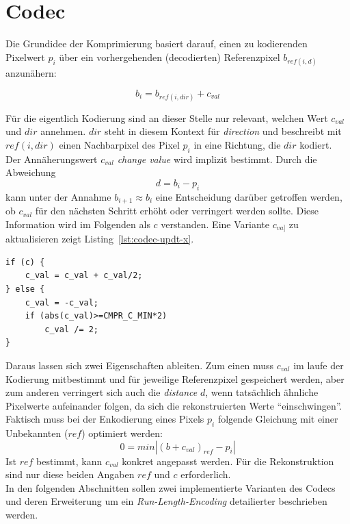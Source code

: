 
\chapter{Codec}


Die Grundidee der Komprimierung basiert darauf, einen zu kodierenden Pixelwert
$p_{i}$  \"uber ein vorhergehenden (decodierten) Referenzpixel $b_{ref(i,d)}$ anzun\"ahern:

\begin{equation}
    b_i = b_{ref(i,dir)} + c_{val}
\label{form:enc-basic}
\end{equation}

F\"ur die eigentlich Kodierung sind an dieser Stelle nur relevant, welchen Wert
$c_{val}$ und $dir$ annehmen. $dir$ steht in diesem Kontext f\"ur \textit{direction} und
beschreibt mit $ref(i,dir)$ einen Nachbarpixel des Pixel $p_i$ in eine Richtung,
die $dir$ kodiert. Der Ann\"aherungswert $c_{val}$ \textit{change value} wird implizit 
bestimmt. Durch die Abweichung
\begin{equation}
    d = b_i - p_i
\label{form:enc-dist}
\end{equation}
kann unter der Annahme $b_{i+1} \approx b_i$ eine Entscheidung dar\"uber getroffen 
werden, ob $c_{val}$ f\"ur den n\"achsten Schritt erh\"oht oder verringert werden
sollte. Diese Information wird im Folgenden als $c$ verstanden. Eine Variante
$c_{va]}$ zu aktualisieren zeigt Listing~\ref{lst:codec-updt-x}.
%
\begin{lstlisting}[caption=Aktualisierung von $c_{val}$ anhand des $c$-Flags,%
                   label=lst:codec-updt-x]
if (c) {
    c_val = c_val + c_val/2;
} else {
    c_val = -c_val;
    if (abs(c_val)>=CMPR_C_MIN*2) 
        c_val /= 2;
}
\end{lstlisting}
%
Daraus lassen sich  zwei Eigenschaften ableiten. Zum einen muss $c_{val}$ im
laufe der Kodierung mitbestimmt und f\"ur jeweilige Referenzpixel gespeichert werden, aber
zum anderen verringert sich auch die \textit{distance} $d$, wenn tats\"achlich
\"ahnliche Pixelwerte aufeinander folgen, da sich die rekonstruierten Werte
``einschwingen''.
Faktisch muss bei der Enkodierung eines Pixels $p_i$ folgende Gleichung mit
einer Unbekannten ($ref$) optimiert werden:
\begin{equation}
0 = {min}| (b + c_{val})_{ref} - p_{i}|
\label{form:codec}
\end{equation}
Ist $ref$ bestimmt, kann $c_{val}$ konkret angepasst werden. F\"ur die Rekonstruktion
sind nur diese beiden Angaben $ref$ und $c$ erforderlich.\\
In den folgenden Abschnitten sollen zwei implementierte Varianten des Codecs und
deren Erweiterung um ein \textit{Run-Length-Encoding} detailierter beschrieben werden. 
%
%
%
%
